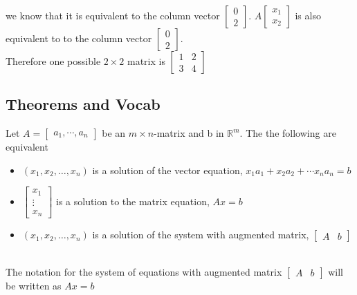 we know that it is equivalent to the column vector $\begin{bmatrix}
  0 \\ 2
\end{bmatrix}$. $A \begin{bmatrix}
  x_1 \\ x_2
\end{bmatrix}$ is also equivalent to to the column vector $\begin{bmatrix}
  0 \\ 2
\end{bmatrix}$. 
\\[8pt]
Therefore one possible $2 \times 2$ matrix is $\begin{bmatrix}
  1 & 2 \\
  3 & 4
\end{bmatrix}$
\subsection{Theorems and Vocab}
Let $A = \begin{bmatrix}
  a_1, \cdots, a_n
\end{bmatrix}$ be an $m \times n$-matrix and b in $\mathbb{R}^m$. The the following
are equivalent
\begin{itemize}
  \item $(x_1, x_2, \dots, x_n)$ is a solution of the vector equation, $x_1a_1 + x_2a_2 + \cdots x_na_n = b$
  \item $\begin{bmatrix}
    x_1 \\
    \vdots \\
    x_n
  \end{bmatrix}$ is a solution to the matrix equation, $Ax = b$
  \item $(x_1, x_2, \dots, x_n)$ is a solution of the system with augmented
    matrix, $\left[ \begin{array}{c|c}
      A & b
  \end{array} \right]$
\end{itemize}
\\[8pt]
The notation for the system of equations with augmented matrix $\begin{bmatrix}
  A & b
\end{bmatrix}$ will be written as $Ax = b$
